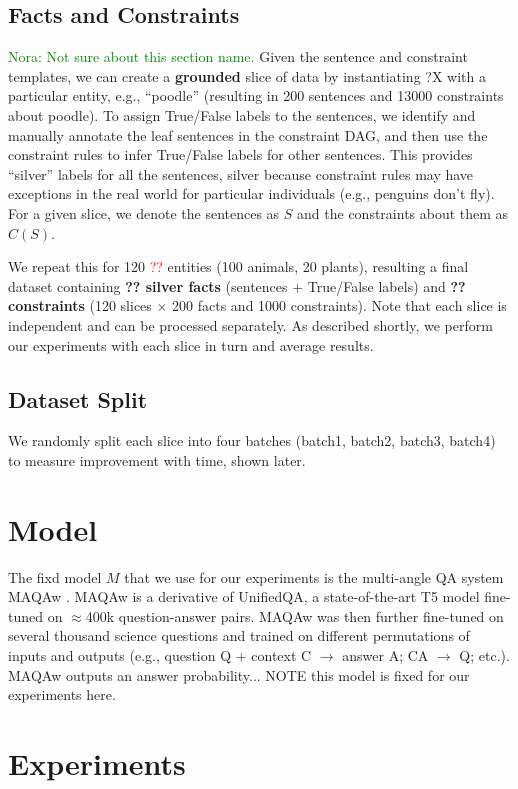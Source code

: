 \documentclass[11pt]{article}
\newcommand{\nk}[1]{\textcolor{green}{Nora: #1}}
\newcommand{\red}[1]{\textcolor{red}{#1}}
\begin{document}
\subsection{Facts and Constraints}
\nk{Not sure about this section name. }
Given the sentence and constraint templates, we can create a {\bf grounded} slice of
data by instantiating ?X with a particular entity, e.g., ``poodle'' (resulting in 200 
sentences and 13000 constraints about poodle). To assign True/False labels to the
sentences, we identify and manually annotate the leaf sentences in the constraint DAG,
and then use the constraint rules to infer True/False labels for other sentences.
This provides ``silver'' labels for all the sentences, silver because constraint
rules may have exceptions in the real world for particular individuals (e.g.,
penguins don't fly). For a given slice, we denote the sentences as $S$ and
the constraints about them as $C(S)$.

We repeat this for 120 \red{??} entities (100 animals, 20 plants), resulting
a final dataset containing {\bf ?? silver facts} (sentences + True/False labels) and {\bf ?? constraints}
(120 slices $\times$ 200 facts and 1000 constraints).
Note that each slice is independent and can be processed separately.
As described shortly, we perform our experiments with each slice in turn
and average results.

\subsection{Dataset Split}

We randomly split each slice into four batches (batch1, batch2, batch3, batch4) to measure
improvement with time, shown later.

\section{Model}

The fixd model $M$ that we use for our experiments is the multi-angle QA system MAQAw \cite{arc-da}.
MAQAw is a derivative of UnifiedQA, a state-of-the-art T5 model fine-tuned on $\approx$400k question-answer pairs.
MAQAw was then 
further fine-tuned on several thousand science questions and trained on different permutations of inputs and outputs
(e.g., question Q + context C $\rightarrow$ answer A; CA $\rightarrow$ Q; etc.). MAQAw outputs an answer probability...
NOTE this model is fixed for our experiments here.

\section{Experiments}
\end{document}
